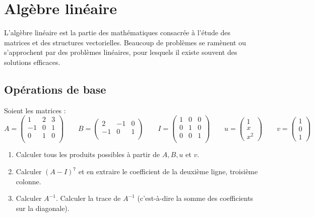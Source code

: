 \documentclass[class=report,crop=false]{standalone}
\begin{document}


\setcounter{section}{4}
\section{Algèbre linéaire}

L'algèbre linéaire est la partie des mathématiques consacrée à l'étude 
des matrices et des structures vectorielles.
Beaucoup de problèmes se ramènent ou s'approchent par 
des problèmes linéaires, pour lesquels il existe souvent 
des solutions efficaces.


\subsection{Opérations de base}

\begin{tp}
Soient les matrices :
$$A = 
\begin{pmatrix}
1&2&3\\
-1&0&1\\
0&1&0\\ 
\end{pmatrix}
\qquad
B = 
\begin{pmatrix}
2&-1&0\\
-1&0&1\\ 
\end{pmatrix}
\qquad
I = 
\begin{pmatrix}
1&0&0\\
0&1&0\\ 
0&0&1\\ 
\end{pmatrix}
\qquad
u = \begin{pmatrix}1\\x\\x^2\end{pmatrix}
\qquad
v = \begin{pmatrix}1\\0\\1\end{pmatrix}$$

\begin{enumerate}
  \item Calculer tous les produits possibles 
  à partir de $A,B,u$ et $v$.
  
  \item Calculer $(A-I)^7$ et en extraire le coefficient 
  de la deuxième ligne, troisième colonne.
  
  \item Calculer $A^{-1}$. Calculer la trace de $A^{-1}$
  (c'est-à-dire la somme des coefficients sur la diagonale).
\end{enumerate}
  
\end{tp}
\end{document}
